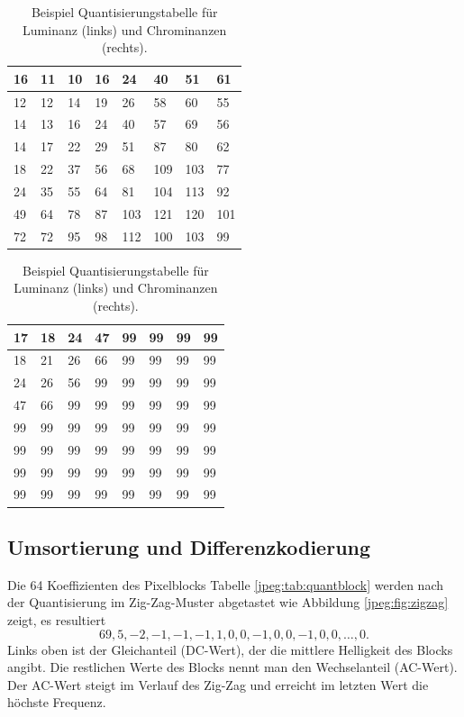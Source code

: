 \begin{table}
    \centering
    \begin{tabularx}{0.47\linewidth}{|X|X|X|X|X|X|X|X|}
        \hline
        16 & 11 & 10 & 16 & 24  & 40 & 51 & 61    \\ \hline
        12 & 12 & 14 & 19 & 26  & 58 & 60 & 55    \\ \hline
        14 & 13 & 16 & 24 & 40  & 57 & 69 & 56    \\ \hline
        14 & 17 & 22 & 29 & 51  & 87 & 80 & 62    \\ \hline
        18 & 22 & 37 & 56 & 68  & 109 & 103 & 77  \\ \hline
        24 & 35 & 55 & 64 & 81  & 104 & 113 & 92  \\ \hline
        49 & 64 & 78 & 87 & 103 & 121 & 120 & 101 \\ \hline
        72 & 72 & 95 & 98 & 112 & 100 & 103 & 99  \\ \hline        
    \end{tabularx}
    \qquad
    \begin{tabularx}{0.47\linewidth}{|X|X|X|X|X|X|X|X|}
        \hline
        17 & 18 & 24 & 47 & 99 & 99 & 99 & 99  \\ \hline
        18 & 21 & 26 & 66 & 99 & 99 & 99 & 99  \\ \hline
        24 & 26 & 56 & 99 & 99 & 99 & 99 & 99  \\ \hline
        47 & 66 & 99 & 99 & 99 & 99 & 99 & 99  \\ \hline
        99 & 99 & 99 & 99 & 99 & 99 & 99 & 99  \\ \hline
        99 & 99 & 99 & 99 & 99 & 99 & 99 & 99  \\ \hline
        99 & 99 & 99 & 99 & 99 & 99 & 99 & 99  \\ \hline
        99 & 99 & 99 & 99 & 99 & 99 & 99 & 99  \\ \hline  	  
    \end{tabularx}
    \caption{Beispiel Quantisierungstabelle für Luminanz (links) und Chrominanzen (rechts).
        \label{jpeg:tab:quant}}
\end{table}



\subsection{Umsortierung und Differenzkodierung
\label{jpeg:subsection:umsortierung}}
%
Die 64 Koeffizienten des Pixelblocks Tabelle \ref{jpeg:tab:quantblock} werden nach der Quantisierung im Zig-Zag-Muster abgetastet wie Abbildung \ref{jpeg:fig:zigzag} zeigt, es resultiert
\begin{equation}
    69, 5, -2, -1, -1, -1, 1, 0, 0, -1, 0, 0, -1, 0, 0,\dots, 0.
    \label{jpeg:equation:abgetastet}
\end{equation}
Links oben ist der Gleichanteil (DC-Wert), der die mittlere Helligkeit des Blocks angibt.
Die rest\-lichen Werte des Blocks nennt man den Wechselanteil (AC-Wert).
Der AC-Wert steigt im Verlauf des Zig-Zag und erreicht im letzten Wert die höchste Frequenz.

